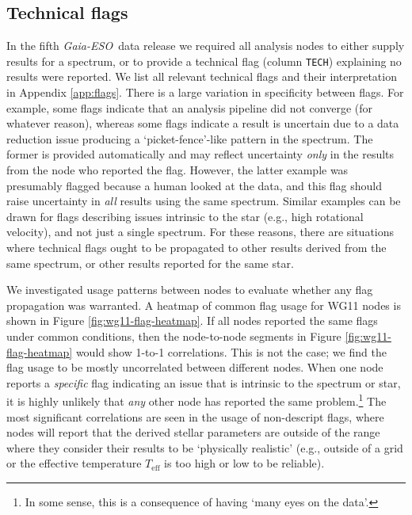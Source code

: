 \documentclass[preprint]{aastex}
\newcommand{\project}[1]{\textsl{#1}}
\newcommand{\gaiaeso}{\project{Gaia-ESO}}
\newcommand{\teff}{T_{\mathrm{eff}}}
\begin{document}








\subsection{Technical flags}
\label{sec:technical-flags}

In the fifth \gaiaeso\ data release we required all analysis nodes to either
supply results for a spectrum, or to provide a technical flag (column \texttt{TECH})
explaining no results were reported. We list all relevant technical flags and their
interpretation in Appendix \ref{app:flags}. There is a large variation in specificity 
between flags. For example, some flags indicate that an analysis pipeline did not 
converge (for whatever reason), whereas some flags indicate a result is uncertain 
due to a data reduction issue producing a `picket-fence'-like pattern in the 
spectrum. The former is provided automatically and may reflect uncertainty 
\emph{only} in the results from the node who reported the flag. However, the latter 
example was presumably flagged because a human looked at the data, and this flag
should raise uncertainty in \emph{all} results using the same spectrum.  Similar 
examples can be drawn for flags describing issues intrinsic to the star (e.g., high
rotational velocity), and not just a single spectrum.  For these reasons, there are 
situations where technical flags ought to be propagated to other results derived from 
the same spectrum, or other results reported for the same star.


We investigated usage patterns between nodes to evaluate whether any flag propagation
was warranted. A heatmap of common flag usage for WG11 nodes is shown in Figure
\ref{fig:wg11-flag-heatmap}.
If all nodes reported the same flags under common conditions, then the node-to-node 
segments in Figure \ref{fig:wg11-flag-heatmap} would show 1-to-1 correlations. This is 
not the case; we find the flag usage to be mostly uncorrelated between different nodes. 
When one node reports a \emph{specific} flag indicating an issue that is intrinsic to 
the spectrum or star, it is highly unlikely that \emph{any} other node has reported the 
same problem.\footnote{In some sense, this is a consequence of having `many eyes on the 
data'.} The most significant correlations are seen in the usage of non-descript flags,
where nodes will report that the derived stellar parameters are outside of the range 
where they consider their results to be `physically realistic' (e.g., outside of a grid
or the effective temperature $\teff$ is too high or low to be reliable). 
\end{document}
